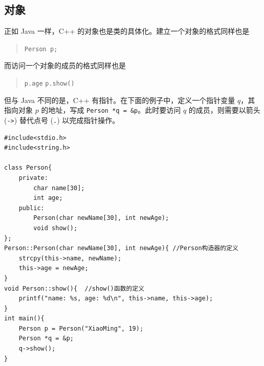 \documentclass[UTF8]{ctexart}
\begin{document}
\BgThispage

\subsection{对象}
正如 Java 一样，C++ 的对象也是类的具体化。建立一个对象的格式同样也是
\begin{quote}
  \verb!Person p;!
\end{quote}
而访问一个对象的成员的格式同样也是
\begin{quote}
  \verb!p.age! \qquad \verb!p.show()!
\end{quote}

但与 Java 不同的是，C++ 有指针。在下面的例子中，定义一个指针变量 $q$，其指向对象 $p$ 的地址，写成 \verb!Person *q = &p!。此时要访问 $q$ 的成员，则需要以箭头 (\verb!->!) 替代点号 (\verb!.!) 以完成指针操作。

\begin{lstlisting}
#include<stdio.h>
#include<string.h>

class Person{
	private:
		char name[30];
		int age;
	public:
		Person(char newName[30], int newAge);
		void show();
};
Person::Person(char newName[30], int newAge){ //Person构造器的定义
	strcpy(this->name, newName);
	this->age = newAge;
}
void Person::show(){  //show()函数的定义
	printf("name: %s, age: %d\n", this->name, this->age);
}
int main(){
	Person p = Person("XiaoMing", 19);
	Person *q = &p;
	q->show();
}
\end{lstlisting}
\end{document}
